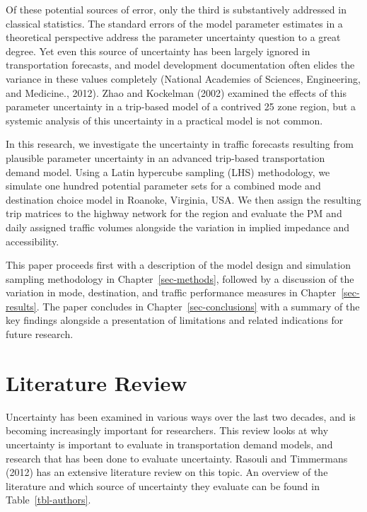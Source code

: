 \documentclass[
  futuretransp,
  submit,
  moreauthors,
]{Definitions/mdpi}
\begin{document}
Of these potential sources of error, only the third is substantively
addressed in classical statistics. The standard errors of the model
parameter estimates in a theoretical perspective address the parameter
uncertainty question to a great degree. Yet even this source of
uncertainty has been largely ignored in transportation forecasts, and
model development documentation often elides the variance in these
values completely (National Academies of Sciences, Engineering, and
Medicine., 2012). Zhao and Kockelman (2002) examined the effects of this
parameter uncertainty in a trip-based model of a contrived 25 zone
region, but a systemic analysis of this uncertainty in a practical model
is not common.

In this research, we investigate the uncertainty in traffic forecasts
resulting from plausible parameter uncertainty in an advanced trip-based
transportation demand model. Using a Latin hypercube sampling (LHS)
methodology, we simulate one hundred potential parameter sets for a
combined mode and destination choice model in Roanoke, Virginia, USA. We
then assign the resulting trip matrices to the highway network for the
region and evaluate the PM and daily assigned traffic volumes alongside
the variation in implied impedance and accessibility.

This paper proceeds first with a description of the model design and
simulation sampling methodology in Chapter~\ref{sec-methods}, followed
by a discussion of the variation in mode, destination, and traffic
performance measures in Chapter~\ref{sec-results}. The paper concludes
in Chapter~\ref{sec-conclusions} with a summary of the key findings
alongside a presentation of limitations and related indications for
future research.


\section{Literature Review}\label{literature-review}

Uncertainty has been examined in various ways over the last two decades,
and is becoming increasingly important for researchers. This review
looks at why uncertainty is important to evaluate in transportation
demand models, and research that has been done to evaluate uncertainty.
Rasouli and Timmermans (2012) has an extensive literature review on this
topic. An overview of the literature and which source of uncertainty
they evaluate can be found in Table~\ref{tbl-authors}.
\end{document}
